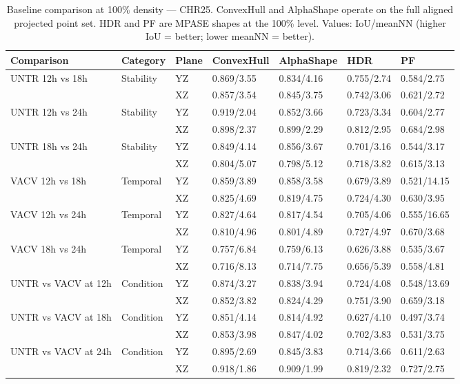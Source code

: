 \begin{table}[ht]
\centering
\small
\caption{Baseline comparison at 100\% density --- CHR25. ConvexHull and AlphaShape operate on the full aligned projected point set. HDR and PF are MPASE shapes at the 100\% level. Values: IoU/meanNN (higher IoU = better; lower meanNN = better).}
\label{tab:baseline_100_chr25}
\begin{tabular}{llllll}
\toprule
Comparison & Category & Plane & ConvexHull & AlphaShape & HDR & PF \\
\midrule
UNTR 12h vs 18h & Stability & YZ & 0.869/3.55 & 0.834/4.16 & 0.755/2.74 & 0.584/2.75 \\
 &  & XZ & 0.857/3.54 & 0.845/3.75 & 0.742/3.06 & 0.621/2.72 \\
UNTR 12h vs 24h & Stability & YZ & 0.919/2.04 & 0.852/3.66 & 0.723/3.34 & 0.604/2.77 \\
 &  & XZ & 0.898/2.37 & 0.899/2.29 & 0.812/2.95 & 0.684/2.98 \\
UNTR 18h vs 24h & Stability & YZ & 0.849/4.14 & 0.856/3.67 & 0.701/3.16 & 0.544/3.17 \\
 &  & XZ & 0.804/5.07 & 0.798/5.12 & 0.718/3.82 & 0.615/3.13 \\
VACV 12h vs 18h & Temporal & YZ & 0.859/3.89 & 0.858/3.58 & 0.679/3.89 & 0.521/14.15 \\
 &  & XZ & 0.825/4.69 & 0.819/4.75 & 0.724/4.30 & 0.630/3.95 \\
VACV 12h vs 24h & Temporal & YZ & 0.827/4.64 & 0.817/4.54 & 0.705/4.06 & 0.555/16.65 \\
 &  & XZ & 0.810/4.96 & 0.801/4.89 & 0.727/4.97 & 0.670/3.68 \\
VACV 18h vs 24h & Temporal & YZ & 0.757/6.84 & 0.759/6.13 & 0.626/3.88 & 0.535/3.67 \\
 &  & XZ & 0.716/8.13 & 0.714/7.75 & 0.656/5.39 & 0.558/4.81 \\
UNTR vs VACV at 12h & Condition & YZ & 0.874/3.27 & 0.838/3.94 & 0.724/4.08 & 0.548/13.69 \\
 &  & XZ & 0.852/3.82 & 0.824/4.29 & 0.751/3.90 & 0.659/3.18 \\
UNTR vs VACV at 18h & Condition & YZ & 0.851/4.14 & 0.814/4.92 & 0.627/4.10 & 0.497/3.74 \\
 &  & XZ & 0.853/3.98 & 0.847/4.02 & 0.702/3.83 & 0.531/3.75 \\
UNTR vs VACV at 24h & Condition & YZ & 0.895/2.69 & 0.845/3.83 & 0.714/3.66 & 0.611/2.63 \\
 &  & XZ & 0.918/1.86 & 0.909/1.99 & 0.819/2.32 & 0.727/2.75 \\
\bottomrule
\end{tabular}
\end{table}